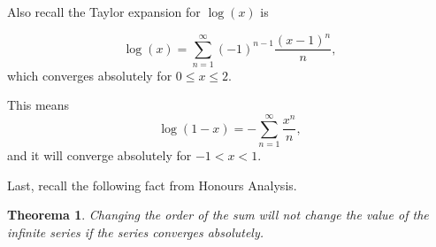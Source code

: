 \documentclass{article}
\newtheorem{theorem}{Theorema}
\theoremstyle{definition}
\theoremstyle{definition}
\theoremstyle{remark}
\begin{document}
Also recall the Taylor expansion for $\log(x)$ is 

\begin{equation}
	\log(x) = \sum_{n=1}^{\infty} (-1)^{n-1}\frac{(x-1)^n}{n},
\end{equation}
which converges absolutely for $0 \leq x \leq 2$.

This means 
\begin{equation}\label{taylor_log}
	\log(1-x) = - \sum_{n=1}^{\infty} \frac{x^n}{n},
\end{equation}
and it will converge absolutely for $-1<x< 1$.

Last, recall the following fact from Honours Analysis.

\begin{theorem}\label{order_of_sum}
	Changing the order of the sum will not change the value of the infinite series if the series converges absolutely.
\end{theorem}
\end{document}
